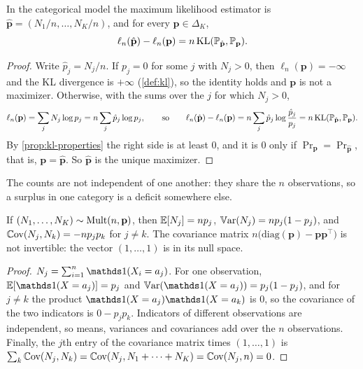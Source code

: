 \begin{proposition}
\label{prop:gof-mle}
In the categorical model the maximum likelihood estimator is $\hat{\mathbf{p}} = (N_1/n, \ldots, N_K/n)$, and for every $\mathbf{p} \in \Delta_K$,
\[
\ell_n(\hat{\mathbf{p}}) - \ell_n(\mathbf{p}) = n\,\mathrm{KL}(\mathbb{P}_{\hat{\mathbf{p}}}, \mathbb{P}_{\mathbf{p}}).
\]
\end{proposition}

\begin{proof}
Write $\hat{p}_j = N_j/n$.
If $p_j = 0$ for some $j$ with $N_j > 0$, then $\ell_n(\mathbf{p}) = -\infty$ and the KL divergence is $+\infty$ (\cref{def:kl}), so the identity holds and $\mathbf{p}$ is not a maximizer.
Otherwise, with the sums over the $j$ for which $N_j > 0$,
\[
\ell_n(\mathbf{p}) = \sum_j N_j\log p_j = n\sum_j \hat{p}_j\log p_j,
\qquad\text{so}\qquad
\ell_n(\hat{\mathbf{p}}) - \ell_n(\mathbf{p}) = n\sum_j \hat{p}_j\log\frac{\hat{p}_j}{p_j} = n\,\mathrm{KL}(\mathbb{P}_{\hat{\mathbf{p}}}, \mathbb{P}_{\mathbf{p}}).
\]
By \cref{prop:kl-properties} the right side is at least $0$, and it is $0$ only if $\Pr_{\mathbf{p}} = \Pr_{\hat{\mathbf{p}}}$, that is, $\mathbf{p} = \hat{\mathbf{p}}$.
So $\hat{\mathbf{p}}$ is the unique maximizer.
\end{proof}

The counts are not independent of one another: they share the $n$ observations, so a surplus in one category is a deficit somewhere else.

\begin{proposition}
\label{prop:gof-counts}
If $(N_1, \ldots, N_K) \sim \mathrm{Mult}(n, \mathbf{p})$, then $\operatorname*{\mathbb{E}}[N_j] = np_j$, $\operatorname*{\mathbb{V}\text{ar}}(N_j) = np_j(1 - p_j)$, and $\operatorname*{\mathbb{C}\text{ov}}(N_j, N_k) = -np_jp_k$ for $j \neq k$. The covariance matrix $n\big(\mathrm{diag}(\mathbf{p}) - \mathbf{p}\mathbf{p}^\top\big)$ is not invertible: the vector $(1, \ldots, 1)$ is in its null space.
\end{proposition}

\begin{proof}
$N_j = \sum_{i=1}^n \ind(X_i = a_j)$.
For one observation, $\E[\ind(X = a_j)] = p_j$ and $\var(\ind(X = a_j)) = p_j(1 - p_j)$, and for $j \neq k$ the product $\ind(X = a_j)\ind(X = a_k)$ is $0$, so the covariance of the two indicators is $0 - p_jp_k$.
Indicators of different observations are independent, so means, variances and covariances add over the $n$ observations.
Finally, the $j$th entry of the covariance matrix times $(1, \ldots, 1)$ is $\sum_k \operatorname*{\mathbb{C}\text{ov}}(N_j, N_k) = \operatorname*{\mathbb{C}\text{ov}}(N_j, N_1 + \cdots + N_K) = \operatorname*{\mathbb{C}\text{ov}}(N_j, n) = 0$.
\end{proof}


